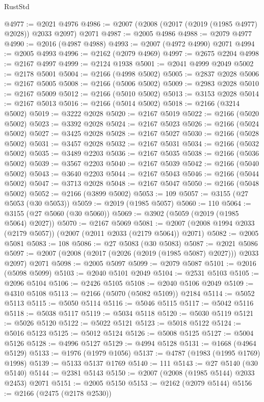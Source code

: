 \begin{lexlean}{RustStd}
\begin{coremodule}
@4977 := @2021 @4976
@4986 := @2007 (@2008 (@2017 (@2019 (@1985 @4977) @2028)) @2033 @2097) @2071
@4987 := @2005 @4986
@4988 := @2079 @4977
@4990 := @2016 (@4987 @4988)
@4993 := @2007 (@4972 @4990) @2071
@4994 := @2005 @4993
@4996 := @2162 (@2079 @4969)
@4997 := @2675 @2204
@4998 := @2167 @4997
@4999 := @2124 @1938
@5001 := @2041 @4999 @2049
@5002 := @2178 @5001
@5004 := @2166 (@4998 @5002)
@5005 := @2837 @2028
@5006 := @2167 @5005
@5008 := @2166 (@5006 @5002)
@5009 := @2983 @2028
@5010 := @2167 @5009
@5012 := @2166 (@5010 @5002)
@5013 := @3153 @2028
@5014 := @2167 @5013
@5016 := @2166 (@5014 @5002)
@5018 := @2166 (@3214 @5002)
@5019 := @3222 @2028
@5020 := @2167 @5019
@5022 := @2166 (@5020 @5002)
@5023 := @3392 @2028
@5024 := @2167 @5023
@5026 := @2166 (@5024 @5002)
@5027 := @3425 @2028
@5028 := @2167 @5027
@5030 := @2166 (@5028 @5002)
@5031 := @3457 @2028
@5032 := @2167 @5031
@5034 := @2166 (@5032 @5002)
@5035 := @3489 @2203
@5036 := @2167 @5035
@5038 := @2166 (@5036 @5002)
@5039 := @3567 @2203
@5040 := @2167 @5039
@5042 := @2166 (@5040 @5002)
@5043 := @3640 @2203
@5044 := @2167 @5043
@5046 := @2166 (@5044 @5002)
@5047 := @3713 @2028
@5048 := @2167 @5047
@5050 := @2166 (@5048 @5002)
@5052 := @2166 (@3899 @5002)
@5053 := 109
@5057 := @3155 (@27 @5053 (@30 @5053))
@5059 := @2019 (@1985 @5057)
@5060 := 110
@5064 := @3155 (@27 @5060 (@30 @5060))
@5069 := @3902 (@5059 (@2019 (@1985 @5064) @2027))
@5070 := @2167 @5069
@5081 := @2007 (@2008 @1994 @2033 (@2179 @5057)) (@2007 (@2011 @2033 (@2179 @5064)) @2071)
@5082 := @2005 @5081
@5083 := 108
@5086 := @27 @5083 (@30 @5083)
@5087 := @2021 @5086
@5097 := @2007 (@2008 (@2017 (@2026 (@2019 (@1985 @5087) @2027))) @2033 @2097) @2071
@5098 := @2005 @5097
@5099 := @2079 @5087
@5101 := @2016 (@5098 @5099)
@5103 := @2040 @5101 @2049
@5104 := @2531 @5103
@5105 := @2096 @5104
@5106 := @2426 @5105
@5108 := @2040 @5106 @2049
@5109 := @4310 @5108
@5113 := @2166 (@5070 (@5082 @5109)) @2184
@5114 := @5052 @5113
@5115 := @5050 @5114
@5116 := @5046 @5115
@5117 := @5042 @5116
@5118 := @5038 @5117
@5119 := @5034 @5118
@5120 := @5030 @5119
@5121 := @5026 @5120
@5122 := @5022 @5121
@5123 := @5018 @5122
@5124 := @5016 @5123
@5125 := @5012 @5124
@5126 := @5008 @5125
@5127 := @5004 @5126
@5128 := @4996 @5127
@5129 := @4994 @5128
@5131 := @1668 (@4964 @5129)
@5133 := @1976 (@1979 @1056)
@5137 := @4787 (@1983 (@1995 @1769) @1998)
@5139 := @5133 @5137 @1769
@5140 := 111
@5143 := @27 @5140 (@30 @5140)
@5144 := @2381 @5143
@5150 := @2007 (@2008 (@1985 @5144) @2033 @2453) @2071
@5151 := @2005 @5150
@5153 := @2162 (@2079 @5144)
@5156 := @2166 (@2475 (@2178 @2530))

\end{coremodule}
\end{lexlean}
